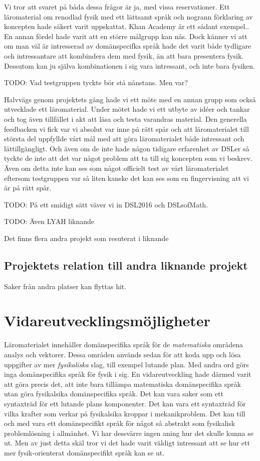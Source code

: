 \begin{binge}
Vi tror att svaret på båda dessa frågor är ja, med vissa reservationer. Ett läromaterial om renodlad fysik med ett lättsamt språk och nogrann förklaring av koncepten hade säkert varit uppskattat. Khan Academy är ett sådant exempel.\cite{khan}. En annan fördel hade varit att en större målgrupp kan nås. Dock känner vi att om man väl är intresserad av domänspecifka språk hade det varit både tydligare och intressantare att kombindera dem med fysik, än att bara presentera fysik. Dessutom kan ju själva kombinationen i sig vara intressant, och inte bara fysiken.

TODO: Vad testgruppen tyckte bör stå nånstans. Men var?

Halvvägs genom projektets gång hade vi ett möte med en annan grupp som också utvecklade ett läromaterial. Under mötet hade vi ett utbyte av idéer och tankar och tog även tillfället i akt att läsa och testa varandras material. Den generella feedbacken vi fick var vi absolut var inne på rätt spår och att läromaterialet till största del uppfyllde vårt mål med att göra läromaterialet både intressant och lättillgängligt. Och även om de inte hade någon tidigare erfarenhet av DSLer så tyckte de inte att det var något problem att ta till sig koncepten som vi beskrev. Även om detta inte kan ses som något officielt test av vårt läromaterialet eftersom testgruppen var så liten kanske det kan ses som en fingervisning att vi är på rätt spår.

TODO: På ett smidigt sätt väver vi in DSL2016 och DSLsofMath.

TODO: Även LYAH liknande

Det finns flera andra projekt som resuterat i liknande 

\subsection{Projektets relation till andra liknande projekt}

Saker från andra platser kan flyttas hit.

\section{Vidareutvecklingsmöjligheter}

Läromaterialet innehåller domänspecifika språk för de \textit{matematiska} områdena analys och vektorer. Dessa områden används sedan för att koda upp och lösa uppgifter av mer \textit{fysikaliska} slag, till exempel lutande plan. Med andra ord görs inga domänspecifika språk för fysik i sig. En vidareutveckling hade därmed varit att göra precis det, att inte bara tillämpa matematiska domänspecifika språk utan göra fysikalsika domänspecifika språk. Det kan vara saker som ett syntaxträd för ett lutande plans komponenter. Det kan vara ett syntaxträd för vilka krafter som verkar på fysikalsika kroppar i mekanikproblem. Det kan till och med vara ett domänspecifikt språk för något så abstrakt som fysikalisk problemlösning i allmänhet. Vi har dessvärre ingen aning hur det skulle kunna se ut. Men av just detta skäl tror vi det hade varit väldigt intressant att se hur ett mer fysik-orienterat domänspecifikt språk kan se ut.


\end{binge}
